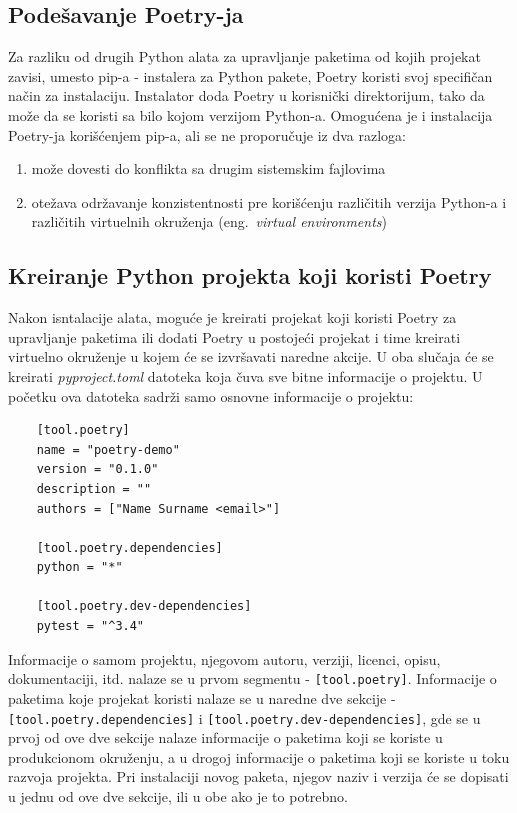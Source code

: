 \documentclass[12pt]{report}
\begin{document}
\subsection{Podešavanje Poetry-ja}
Za razliku od drugih Python alata za upravljanje paketima od kojih projekat zavisi, umesto pip-a - instalera za Python pakete, Poetry koristi svoj specifičan način za instalaciju. Instalator doda Poetry u korisnički direktorijum, tako da može da se koristi sa bilo kojom verzijom Python-a. Omogućena je i instalacija Poetry-ja korišćenjem pip-a, ali se ne proporučuje iz dva razloga:

\begin{enumerate}
    \item može dovesti do konflikta sa drugim sistemskim fajlovima
    \item otežava održavanje konzistentnosti pre korišćenju različitih verzija Python-a i različitih virtuelnih okruženja (eng.\ \textit{virtual environments})
\end{enumerate}

\subsection{Kreiranje Python projekta koji koristi Poetry}
Nakon isntalacije alata, moguće je kreirati projekat koji koristi Poetry za upravljanje paketima ili dodati Poetry u postojeći projekat i time kreirati virtuelno okruženje u kojem će se izvršavati naredne akcije. U oba slučaja će se kreirati \textit{pyproject.toml} datoteka koja čuva sve bitne informacije o projektu. U početku ova datoteka sadrži samo osnovne informacije o projektu:

\begin{samepage}
    \begin{verbatim}
    [tool.poetry]
    name = "poetry-demo"
    version = "0.1.0"
    description = ""
    authors = ["Name Surname <email>"]

    [tool.poetry.dependencies]
    python = "*"

    [tool.poetry.dev-dependencies]
    pytest = "^3.4"
    \end{verbatim}
\end{samepage}

Informacije o samom projektu, njegovom autoru, verziji, licenci, opisu, dokumentaciji, itd. nalaze se u prvom segmentu - \texttt{[tool.poetry]}. Informacije o paketima koje projekat koristi nalaze se u naredne dve sekcije - \texttt{[tool.poetry.dependencies]} i \texttt{[tool.poetry.dev-dependencies]}, gde se u prvoj od ove dve sekcije nalaze informacije o paketima koji se koriste u produkcionom okruženju, a u drogoj informacije o paketima koji se koriste u toku razvoja projekta. Pri instalaciji novog paketa, njegov naziv i verzija će se dopisati u jednu od ove dve sekcije, ili u obe ako je to potrebno.
\end{document}
